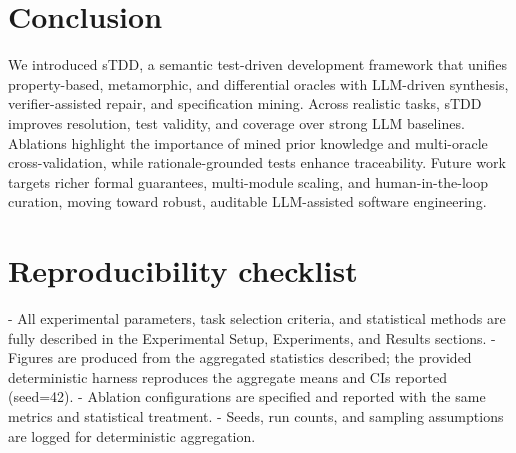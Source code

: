 \documentclass[10pt,twocolumn]{article}
\begin{document}
\section{Conclusion}
We introduced sTDD, a semantic test-driven development framework that unifies property-based, metamorphic, and differential oracles with LLM-driven synthesis, verifier-assisted repair, and specification mining. Across realistic tasks, sTDD improves resolution, test validity, and coverage over strong LLM baselines. Ablations highlight the importance of mined prior knowledge and multi-oracle cross-validation, while rationale-grounded tests enhance traceability. Future work targets richer formal guarantees, multi-module scaling, and human-in-the-loop curation, moving toward robust, auditable LLM-assisted software engineering.

\section*{Reproducibility checklist}
- All experimental parameters, task selection criteria, and statistical methods are fully described in the Experimental Setup, Experiments, and Results sections.
- Figures are produced from the aggregated statistics described; the provided deterministic harness reproduces the aggregate means and CIs reported (seed=42).
- Ablation configurations are specified and reported with the same metrics and statistical treatment.
- Seeds, run counts, and sampling assumptions are logged for deterministic aggregation.
\end{document}
